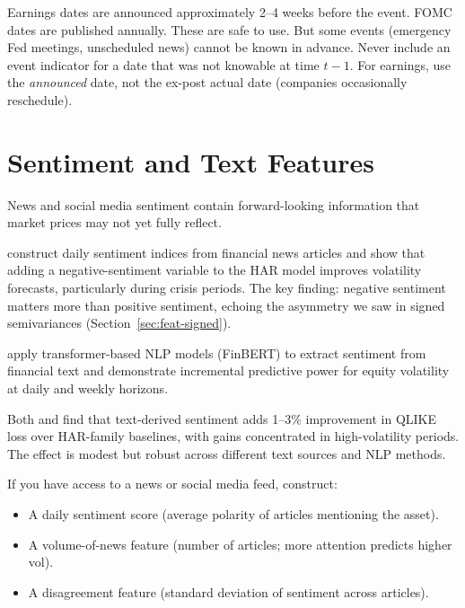 \begin{warning}
Earnings dates are announced approximately 2--4 weeks before the event.
FOMC dates are published annually.
These are safe to use.
But some events (emergency Fed meetings, unscheduled news) cannot be known in advance.
Never include an event indicator for a date that was not knowable at time $t-1$.
For earnings, use the \emph{announced} date, not the ex-post actual date (companies occasionally reschedule).
\end{warning}

\section{Sentiment and Text Features}\label{sec:feat-sentiment}

News and social media sentiment contain forward-looking information that market prices may not yet fully reflect.

\citet{AudrinoSignristBallinari2020} construct daily sentiment indices from financial news articles and show that adding a negative-sentiment variable to the HAR model improves volatility forecasts, particularly during crisis periods.
The key finding: negative sentiment matters more than positive sentiment, echoing the asymmetry we saw in signed semivariances (Section~\ref{sec:feat-signed}).

\citet{RahimikiaZohrenPoon2021} apply transformer-based NLP models (FinBERT) to extract sentiment from financial text and demonstrate incremental predictive power for equity volatility at daily and weekly horizons.

\begin{keyresult}
Both \citet{AudrinoSignristBallinari2020} and \citet{RahimikiaZohrenPoon2021} find that text-derived sentiment adds 1--3\% improvement in QLIKE loss over HAR-family baselines, with gains concentrated in high-volatility periods.
The effect is modest but robust across different text sources and NLP methods.
\end{keyresult}

If you have access to a news or social media feed, construct:
\begin{itemize}[nosep]
  \item A daily sentiment score (average polarity of articles mentioning the asset).
  \item A volume-of-news feature (number of articles; more attention predicts higher vol).
  \item A disagreement feature (standard deviation of sentiment across articles).
\end{itemize}

